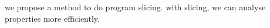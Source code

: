 we propose a method to do program slicing. with slicing, we can analyse properties more efficiently.
